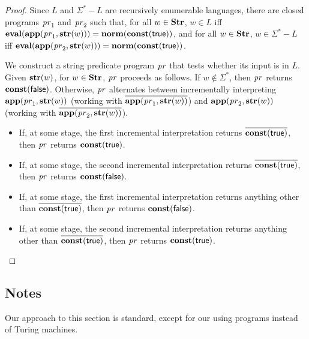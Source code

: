 \begin{proof}
Since $L$ and $\Sigma^*-L$ are recursively enumerable languages,
there are closed programs $\mathit{pr}_1$ and $\mathit{pr}_2$ such that, for all $w\in\mathbf{Str}$,
$w\in L$ iff
$\mathbf{eval}(\mathbf{app}(\mathit{pr}_1,\mathbf{str}(w)))=\mathbf{norm}(\mathbf{const}(\mathsf{true}))$, and
for all $w\in\mathbf{Str}$, $w\in\Sigma^*-L$ iff
$\mathbf{eval}(\mathbf{app}(\mathit{pr}_2,\mathbf{str}(w)))=\mathbf{norm}(\mathbf{const}(\mathsf{true}))$.

We construct a string predicate program $\mathit{pr}$ that tests whether its
input is in $L$.  Given $\mathbf{str}(w)$, for $w\in\mathbf{Str}$, $\mathit{pr}$ proceeds
as follows.  If $w\not\in\Sigma^*$, then $\mathit{pr}$ returns
$\mathbf{const}(\mathsf{false})$.  Otherwise, $\mathit{pr}$ alternates between
incrementally interpreting $\mathbf{app}(\mathit{pr}_1,\mathbf{str}(w))$ (working with
$\overline{\mathbf{app}(\mathit{pr}_1,\mathbf{str}(w))}$) and
$\mathbf{app}(\mathit{pr}_2,\mathbf{str}(w))$ (working with
$\overline{\mathbf{app}(\mathit{pr}_2,\mathbf{str}(w))}$).

\begin{itemize}
\item If, at some stage, the first incremental interpretation returns
  $\overline{\mathbf{const}(\mathsf{true})}$, then $\mathit{pr}$ returns
  $\mathbf{const}(\mathsf{true})$.

\item If, at some stage, the second incremental interpretation returns
  $\overline{\mathbf{const}(\mathsf{true})}$, then $\mathit{pr}$ returns
  $\mathbf{const}(\mathsf{false})$.

\item If, at some stage, the first incremental interpretation returns
  anything other than $\overline{\mathbf{const}(\mathsf{true})}$, then $\mathit{pr}$
  returns $\mathbf{const}(\mathsf{false})$.

\item If, at some stage, the second incremental interpretation returns
  anything other than $\overline{\mathbf{const}(\mathsf{true})}$, then $\mathit{pr}$
  returns $\mathbf{const}(\mathsf{true})$.
\end{itemize}
\end{proof}

%

\subsection{Notes}

Our approach to this section is standard, except for our using
programs instead of Turing machines.


